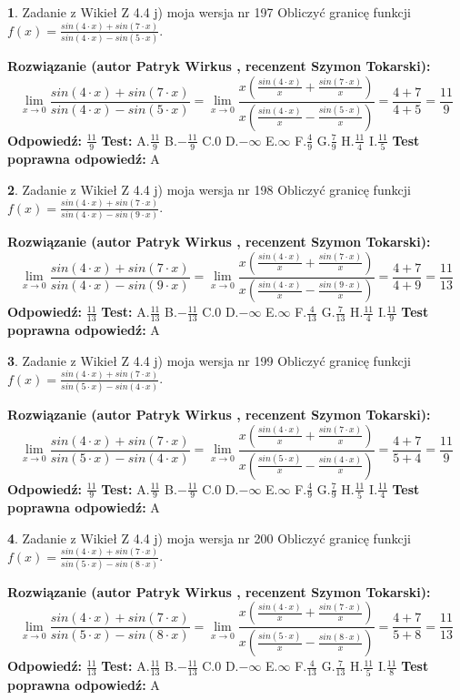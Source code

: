 \documentclass[12pt, a4paper]{article}
\theoremstyle{definition} %
\newtheorem{zad}{}
\newcommand{\zadStart}[1]{\begin{zad}#1\newline}
\newcommand{\zadStop}{\end{zad}}
\newcommand{\rozwStart}[2]{\noindent \textbf{Rozwiązanie (autor #1 , recenzent #2): }\newline}
\newcommand{\rozwStop}{\newline}
\newcommand{\odpStart}{\noindent \textbf{Odpowiedź:}\newline}
\newcommand{\odpStop}{\newline}
\newcommand{\testStart}{\noindent \textbf{Test:}\newline}
\newcommand{\testStop}{\newline}
\newcommand{\kluczStart}{\noindent \textbf{Test poprawna odpowiedź:}\newline}
\newcommand{\kluczStop}{\newline}
\begin{document}
\zadStart{Zadanie z Wikieł Z 4.4 j) moja wersja nr 197}
Obliczyć granicę funkcji $f(x)=\frac{sin(4\cdot x) +sin(7\cdot x)}{sin(4\cdot x) -sin(5\cdot x)}$.
\zadStop
\rozwStart{Patryk Wirkus}{Szymon Tokarski}
$$\lim\limits_{x\to 0}\frac{sin(4\cdot x) +sin(7\cdot x)}{sin(4\cdot x) -sin(5\cdot x)}=\lim\limits_{x\to 0}\frac{x(\frac{sin(4\cdot x)}{x}+\frac{sin(7\cdot x)}{x})}{x(\frac{sin(4\cdot x)}{x}-\frac{sin(5\cdot x)}{x})}=\frac{4+7}{4+5} = \frac{11}{9}$$
\rozwStop
\odpStart
$\frac{11}{9}$
\odpStop
\testStart
A.$\frac{11}{9}$
B.$-\frac{11}{9}$
C.$0$
D.$-\infty$
E.$\infty$
F.$\frac{4}{9}$
G.$\frac{7}{9}$
H.$\frac{11}{4}$
I.$\frac{11}{5}$
\testStop
\kluczStart
A
\kluczStop



\zadStart{Zadanie z Wikieł Z 4.4 j) moja wersja nr 198}
Obliczyć granicę funkcji $f(x)=\frac{sin(4\cdot x) +sin(7\cdot x)}{sin(4\cdot x) -sin(9\cdot x)}$.
\zadStop
\rozwStart{Patryk Wirkus}{Szymon Tokarski}
$$\lim\limits_{x\to 0}\frac{sin(4\cdot x) +sin(7\cdot x)}{sin(4\cdot x) -sin(9\cdot x)}=\lim\limits_{x\to 0}\frac{x(\frac{sin(4\cdot x)}{x}+\frac{sin(7\cdot x)}{x})}{x(\frac{sin(4\cdot x)}{x}-\frac{sin(9\cdot x)}{x})}=\frac{4+7}{4+9} = \frac{11}{13}$$
\rozwStop
\odpStart
$\frac{11}{13}$
\odpStop
\testStart
A.$\frac{11}{13}$
B.$-\frac{11}{13}$
C.$0$
D.$-\infty$
E.$\infty$
F.$\frac{4}{13}$
G.$\frac{7}{13}$
H.$\frac{11}{4}$
I.$\frac{11}{9}$
\testStop
\kluczStart
A
\kluczStop



\zadStart{Zadanie z Wikieł Z 4.4 j) moja wersja nr 199}
Obliczyć granicę funkcji $f(x)=\frac{sin(4\cdot x) +sin(7\cdot x)}{sin(5\cdot x) -sin(4\cdot x)}$.
\zadStop
\rozwStart{Patryk Wirkus}{Szymon Tokarski}
$$\lim\limits_{x\to 0}\frac{sin(4\cdot x) +sin(7\cdot x)}{sin(5\cdot x) -sin(4\cdot x)}=\lim\limits_{x\to 0}\frac{x(\frac{sin(4\cdot x)}{x}+\frac{sin(7\cdot x)}{x})}{x(\frac{sin(5\cdot x)}{x}-\frac{sin(4\cdot x)}{x})}=\frac{4+7}{5+4} = \frac{11}{9}$$
\rozwStop
\odpStart
$\frac{11}{9}$
\odpStop
\testStart
A.$\frac{11}{9}$
B.$-\frac{11}{9}$
C.$0$
D.$-\infty$
E.$\infty$
F.$\frac{4}{9}$
G.$\frac{7}{9}$
H.$\frac{11}{5}$
I.$\frac{11}{4}$
\testStop
\kluczStart
A
\kluczStop



\zadStart{Zadanie z Wikieł Z 4.4 j) moja wersja nr 200}
Obliczyć granicę funkcji $f(x)=\frac{sin(4\cdot x) +sin(7\cdot x)}{sin(5\cdot x) -sin(8\cdot x)}$.
\zadStop
\rozwStart{Patryk Wirkus}{Szymon Tokarski}
$$\lim\limits_{x\to 0}\frac{sin(4\cdot x) +sin(7\cdot x)}{sin(5\cdot x) -sin(8\cdot x)}=\lim\limits_{x\to 0}\frac{x(\frac{sin(4\cdot x)}{x}+\frac{sin(7\cdot x)}{x})}{x(\frac{sin(5\cdot x)}{x}-\frac{sin(8\cdot x)}{x})}=\frac{4+7}{5+8} = \frac{11}{13}$$
\rozwStop
\odpStart
$\frac{11}{13}$
\odpStop
\testStart
A.$\frac{11}{13}$
B.$-\frac{11}{13}$
C.$0$
D.$-\infty$
E.$\infty$
F.$\frac{4}{13}$
G.$\frac{7}{13}$
H.$\frac{11}{5}$
I.$\frac{11}{8}$
\testStop
\kluczStart
A
\kluczStop
\end{document}
